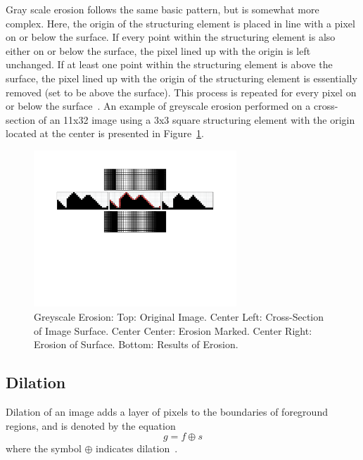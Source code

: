 \documentclass{sig-alternate}
\begin{document}
Gray scale erosion follows the same basic pattern, but is somewhat more complex. Here, the origin of the structuring element is placed in line with a pixel on or below the surface. If every point within the structuring element is also either on or below the surface, the pixel lined up with the origin is left unchanged. If at least one point within the structuring element is above the surface, the pixel lined up with the origin of the structuring element is essentially removed (set to be above the surface). This process is repeated for every pixel on or below the surface~\cite{MorphologyPaper:1987, MorphologyWiki}. An example of greyscale erosion performed on a cross-section of an 11x32 image using a 3x3 square structuring element with the origin located at the center is presented in Figure~\ref{greyscale erosion figure}.
\begin{figure}
\centering
\includegraphics[width=3in,trim={0 4in 0 0},clip]{greyscale_erosion}
\caption{Greyscale Erosion: Top: Original Image. Center Left: Cross-Section of Image Surface. Center Center: Erosion Marked. Center Right: Erosion of Surface. Bottom: Results of Erosion.}
\label{greyscale erosion figure}
\end{figure}

\subsection{Dilation}\label{dilation}
Dilation of an image adds a layer of pixels to the boundaries of foreground regions, and is denoted by the equation
\begin{equation*}
g = f \oplus s
\end{equation*}
where the symbol $\oplus$ indicates dilation~\cite{MorphologyWikiAnonymous, MorphologyBook:2000}.
\end{document}
